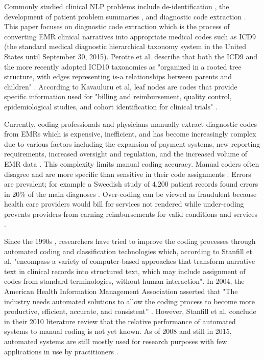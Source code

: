 \documentclass[sigconf]{acmart}
\begin{document}
Commonly studied clinical NLP problems include de-identification \cite{velupillai2015recent}, the development of patient problem summaries \cite{diomaiuta2017novel}, and diagnostic code extraction \cite{perotte2013diagnosis}. This paper focuses on diagnostic code extraction which is the process of converting EMR clinical narratives into appropriate medical codes such as ICD9 (the standard medical diagnostic hierarchical taxonomy system in the United States until September 30, 2015). Perotte et al. describe that both the ICD9 and the more recently adopted ICD10 taxonomies as "organized in a rooted tree structure, with edges representing is-a relationships between parents and children" \cite{perotte2013diagnosis}. According to Kavauluru et al, leaf nodes are codes that provide specific information used for "billing and reimbursement, quality control, epidemiological studies, and cohort identification for clinical trials" \cite{kavuluru2015empirical}.

Currently, coding professionals and physicians manually extract diagnostic codes from EMRs which is expensive, inefficient, and has become increasingly complex due to various factors including the expansion of payment systems, new reporting requirements, increased oversight and regulation, and the increased volume of EMR data \cite{stanfill2010systematic} \cite{AHIMA} \cite{pons2016natural}\cite{velupillai2015recent}. This complexity limits manual coding accuracy. Manual coders often disagree \cite{pestian2007shared} and are more specific than sensitive in their code assignments \cite{birman2005accuracy}. Errors are prevalent; for example a Sweedish study of 4,200 patient records found errors in 20\% of the main diagnoses \cite{velupillai2015recent}. Over-coding can be viewed as fraudulent because health care providers would bill for services not rendered while under-coding prevents providers from earning reimbursements for valid conditions and services \cite{perotte2013diagnosis}.

Since the 1990s \cite{kavuluru2013unsupervised}, researchers have tried to improve the coding processes through automated coding and classification technologies which, according to Stanfill et al, "encompass a variety of computer-based approaches that transform narrative text in clinical records into structured text, which may include assignment of codes from standard terminologies, without human interaction"\cite{stanfill2010systematic}. In 2004, the American Health Information Management Association asserted that "The industry needs automated solutions to allow the coding process to become more productive, efficient, accurate, and consistent” \cite{stanfill2010systematic}. However, Stanfill et al. conclude in their 2010 literature review that the relative performance of automated systems to manual coding is not yet known\cite{stanfill2010systematic}. As of 2008 and still in 2015, automated systems are still mostly used for research purposes with few applications in use by practitioners \cite{meystre2008extracting}\cite{velupillai2015recent}. 
\end{document}
